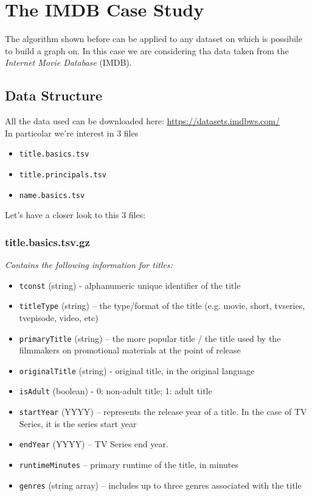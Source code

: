 \section{The IMDB Case Study}
The algorithm shown before can be applied to any dataset on which is possibile to build a graph on. In this case we are considering tha data taken from the \emph{Internet Movie Database} (IMDB).

\subsection{Data Structure}
All the data used can be downloaded here: \url{https://datasets.imdbws.com/} \\

\noindent In particolar we're interest in 3 files
\begin{itemize}
    \item \texttt{title.basics.tsv}
    \item \texttt{title.principals.tsv}
    \item \texttt{name.basics.tsv}
\end{itemize}
Let's have a closer look to this 3 files:

\subsubsection*{title.basics.tsv.gz}
\emph{Contains the following information for titles:}
\begin{itemize}
    \item \texttt{tconst} (string) - alphanumeric unique identifier of the title
    \item \texttt{titleType} (string) – the type/format of the title (e.g. movie, short, tvseries, tvepisode, video, etc)
    \item \texttt{primaryTitle} (string) – the more popular title / the title used by the filmmakers on promotional materials at the point of release
    \item \texttt{originalTitle} (string) - original title, in the original language
    \item \texttt{isAdult} (boolean) - 0: non-adult title; 1: adult title
    \item \texttt{startYear} (YYYY) – represents the release year of a title. In the case of TV Series, it is the series start year
    \item \texttt{endYear} (YYYY) – TV Series end year.
    \item \texttt{runtimeMinutes} – primary runtime of the title, in minutes
    \item \texttt{genres} (string array) – includes up to three genres associated with the title
\end{itemize}

